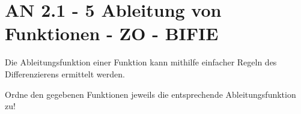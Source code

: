 \section{AN 2.1 - 5 Ableitung von Funktionen - ZO - BIFIE}

\begin{beispiel}[AN 2.1]{1} %
				Die Ableitungsfunktion einer Funktion kann mithilfe einfacher Regeln des Differenzierens ermittelt werden.

Ordne den gegebenen Funktionen jeweils die entsprechende Ableitungsfunktion zu!

\end{beispiel}